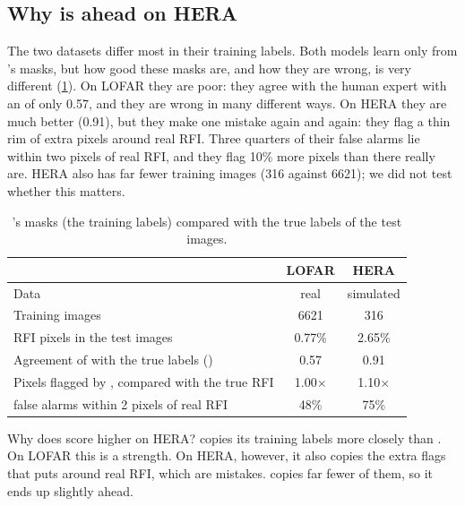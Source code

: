 \subsection{Why \texorpdfstring{\tfunet{}}{tf\_unet} is ahead on HERA}
\label{sec:hera_why}
The two datasets differ most in their training labels. Both models learn only
from \aoflagger{}'s masks, but how good these masks are, and how they are wrong,
is very different (\cref{tab:hera_lofar_labels}). On LOFAR they are poor: they
agree with the human expert with an \Fone{} of only 0.57, and they are wrong in
many different ways. On HERA they are much better (0.91), but they make one
mistake again and again: they flag a thin rim of extra pixels around real RFI.
Three quarters of their false alarms lie within two pixels of real RFI, and they
flag 10\% more pixels than there really are. HERA also has far fewer training
images (316 against 6621); we did not test whether this matters.

\begin{table}[H]
  \centering
  \caption[Training labels on LOFAR and HERA]{\aoflagger{}'s masks (the
    training labels) compared with the true labels of the test images.}
  \label{tab:hera_lofar_labels}
  \footnotesize
  \begin{tabular}{lcc}
    \toprule
     & LOFAR & HERA \\
    \midrule
    Data & real & simulated \\
    Training images & 6621 & 316 \\
    RFI pixels in the test images & 0.77\% & 2.65\% \\
    Agreement of \aoflagger{} with the true labels (\Fone{}) & 0.57 & 0.91 \\
    Pixels flagged by \aoflagger{}, compared with the true RFI & 1.00$\times$ & 1.10$\times$ \\
    \aoflagger{} false alarms within 2 pixels of real RFI & 48\% & 75\% \\
    \bottomrule
  \end{tabular}
\end{table}

Why does \tfunet{} score higher on HERA? \hybrid{} copies its training labels
more closely than \tfunet{}. On LOFAR this is a strength. On HERA, however, it
also copies the extra flags that \aoflagger{} puts around real RFI, which are
mistakes. \tfunet{} copies far fewer of them, so it ends up slightly ahead.
